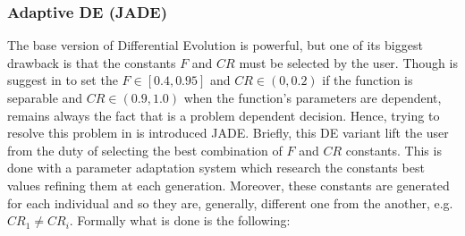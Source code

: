 \subsubsection{Adaptive DE (JADE)}
The base version of Differential Evolution is powerful, but one of its biggest drawback is that the constants $F$ and $CR$ must be selected by the user. Though is suggest in \cite{RPODE:2005} to set the $F\in[0.4, 0.95]$ and $CR \in (0, 0.2)$ if the function is separable and $CR \in (0.9, 1.0)$ when the function's parameters are dependent, remains always the fact that is a problem dependent decision.\newline\newline
Hence, trying to resolve this problem in \cite{JADE:2009} is introduced JADE. Briefly, this DE variant lift the user from the duty of selecting the best combination of $F$ and $CR$ constants. This is done with a parameter adaptation system which research the constants best values refining them at each generation. Moreover, these constants are generated for each individual and so they are, generally, different one from the another, e.g. $\textit{CR}_{1} \neq \textit{CR}_{i}$. Formally what is done is the following:
